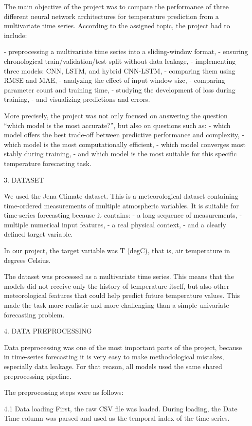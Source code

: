 The main objective of the project was to compare the performance of three different neural network architectures for temperature prediction from a multivariate time series. According to the assigned topic, the project had to include:

- preprocessing a multivariate time series into a sliding-window format,
- ensuring chronological train/validation/test split without data leakage,
- implementing three models: CNN, LSTM, and hybrid CNN-LSTM,
- comparing them using RMSE and MAE,
- analyzing the effect of input window size,
- comparing parameter count and training time,
- studying the development of loss during training,
- and visualizing predictions and errors.

More precisely, the project was not only focused on answering the question “which model is the most accurate?”, but also on questions such as:
- which model offers the best trade-off between predictive performance and complexity,
- which model is the most computationally efficient,
- which model converges most stably during training,
- and which model is the most suitable for this specific temperature forecasting task.

3. DATASET

We used the Jena Climate dataset. This is a meteorological dataset containing time-ordered measurements of multiple atmospheric variables. It is suitable for time-series forecasting because it contains:
- a long sequence of measurements,
- multiple numerical input features,
- a real physical context,
- and a clearly defined target variable.

In our project, the target variable was T (degC), that is, air temperature in degrees Celsius.

The dataset was processed as a multivariate time series. This means that the models did not receive only the history of temperature itself, but also other meteorological features that could help predict future temperature values. This made the task more realistic and more challenging than a simple univariate forecasting problem.

4. DATA PREPROCESSING

Data preprocessing was one of the most important parts of the project, because in time-series forecasting it is very easy to make methodological mistakes, especially data leakage. For that reason, all models used the same shared preprocessing pipeline.

The preprocessing steps were as follows:

4.1 Data loading
First, the raw CSV file was loaded. During loading, the Date Time column was parsed and used as the temporal index of the time series.

